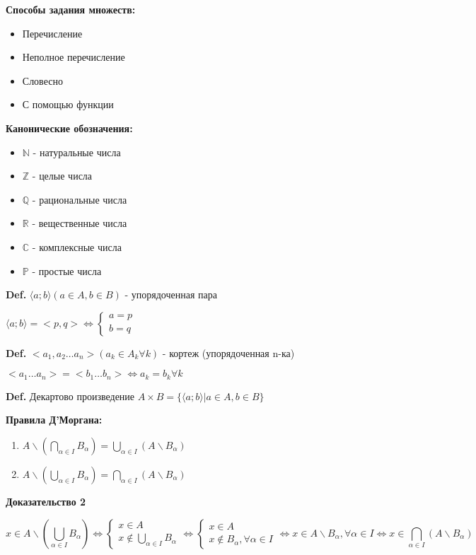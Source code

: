 \documentclass[14pt, letter paper]{article}
\newcommand{\q}[1]{\langle #1 \rangle}
\begin{document}
\textbf{Способы задания множеств:}
\begin{itemize}
    \item Перечисление
    \item Неполное перечисление
    \item Словесно
    \item С помощью функции
\end{itemize}

\textbf{Канонические обозначения:}
\begin{itemize}
    \item $\mathds{N}$ - натуральные числа
    \item $\mathds{Z}$ - целые числа
    \item $\mathds{Q}$ - рациональные числа
    \item $\mathds{R}$ - вещественные числа
    \item $\mathds{C}$ - комплексные числа
    \item $\mathds{P}$ - простые числа
\end{itemize}

\textbf{Def.} $\q{a; b} (a \in A, b \in B)$ - упорядоченная пара \par $\q{a; b} = <p, q> \Leftrightarrow \begin{cases} a = p \\ b = q \end{cases}$

\textbf{Def.} $<a_1, a_2 \ldots a_n> (a_k \in A_k \forall k)$ - кортеж (упорядоченная n-ка)\par $<a_1 \ldots a_n> = <b_1 \ldots b_n> \Leftrightarrow a_k = b_k \forall k$

\textbf{Def.} Декартово произведение $A \times B = \{ \q{a; b} | a \in A, b \in B\}$

\textbf{Правила Д'Моргана:}
\begin{enumerate}
    \item $A \backslash (\bigcap\limits_{\alpha \in I} B_\alpha) = \bigcup\limits_{\alpha \in I} (A \backslash B_\alpha)$
    \item $A \backslash (\bigcup\limits_{\alpha \in I} B_\alpha) = \bigcap\limits_{\alpha \in I} (A \backslash B_\alpha)$
\end{enumerate}

\begin{center} \textbf{Доказательство 2} \end{center}
\[x \in A \backslash (\bigcup\limits_{\alpha \in I} B_\alpha) \Leftrightarrow \begin{cases} x \in A \\ x \notin \bigcup\limits_{\alpha \in I} B_\alpha \end{cases} \Leftrightarrow \begin{cases} x \in A \\ x \notin B_\alpha, \forall \alpha \in I \end{cases} \Leftrightarrow x \in A \backslash B_\alpha, \forall \alpha \in I \Leftrightarrow x \in \bigcap\limits_{\alpha \in I} (A \backslash B_\alpha)\]
\end{document}
